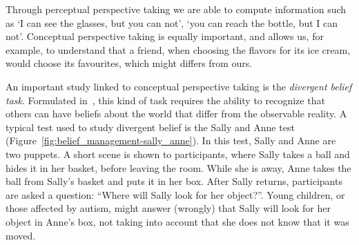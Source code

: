 Through perceptual perspective taking we are able to compute information such as `I can see the glasses, but you can not', `you can reach the bottle, but I can not'. Conceptual perspective taking is equally important, and allows us, for example, to understand that a friend, when choosing the flavors for its ice cream, would choose its favourites, which might differs from ours.

An important study linked to conceptual perspective taking is the \textit{divergent belief task}.  Formulated in~\cite{wimmer1983}, this kind of task requires the ability to recognize that others can have beliefs about the world that differ from the observable reality.  A typical test used to study divergent belief is the Sally and Anne test (Figure~\ref{fig:belief_management-sally_anne}). In this test, Sally and Anne are two puppets. A short scene is shown to participants, where Sally takes a ball and hides it in her basket, before leaving the room. While she is away, Anne takes the ball from Sally's basket and puts it in her  box. After Sally returns, participants are asked a question: ``Where will Sally look for her object?''. Young children, or those affected by autism, might answer (wrongly) that Sally will look for her object in Anne's box, not taking into account that she does not know that it was moved.

